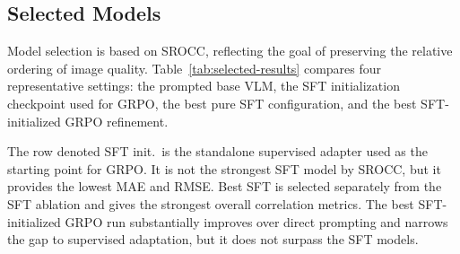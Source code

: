 \documentclass[10pt,twocolumn,letterpaper]{article}
\begin{document}
\subsection{Selected Models}
Model selection is based on SROCC, reflecting the goal of preserving the relative ordering of image quality. Table~\ref{tab:selected-results} compares four representative settings: the prompted base VLM, the SFT initialization checkpoint used for GRPO, the best pure SFT configuration, and the best SFT-initialized GRPO refinement.

\begin{table}[t]
  \centering
  \caption{Overall test-set MOS prediction comparison. Lower MAE/RMSE is better; higher correlation and coverage are better. Best configurations are selected by maximum SROCC.}
  \label{tab:selected-results}
  \scriptsize
  \setlength{\tabcolsep}{2pt}
\end{table}

The row denoted SFT init.\ is the standalone supervised adapter used as the starting point for GRPO. It is not the strongest SFT model by SROCC, but it provides the lowest MAE and RMSE. Best SFT is selected separately from the SFT ablation and gives the strongest overall correlation metrics. The best SFT-initialized GRPO run substantially improves over direct prompting and narrows the gap to supervised adaptation, but it does not surpass the SFT models.
\end{document}
